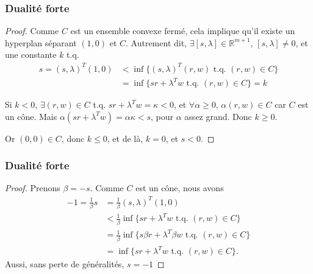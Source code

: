 \documentclass[usepdftitle=false]{beamer}
\def\RR{\mathbb{R}}
\begin{document}
\begin{frame}
\frametitle{Dualité forte}

\begin{proof}

Comme $C$ est un ensemble convexe fermé, cela implique qu'il existe un hyperplan séparant $(1,0)$ et $C$. Autrement dit, $\exists [s, \lambda] \in \RR^{m+1}$, $[s, \lambda] \ne 0$, et une constante $k$ t.q.
\begin{align*}
s = (s, \lambda)^T (1,0) &< \inf \lbrace (s, \lambda)^T(r,w) \mbox{ t.q. } (r,w) \in C \rbrace \\
& = \inf \lbrace sr + \lambda^Tw \mbox{ t.q. } (r,w) \in C \rbrace = k
\end{align*}

Si $k < 0$, $\exists (r,w) \in C$ t.q. $sr + \lambda^T w = \kappa < 0$, et $\forall \alpha \geq 0$, $\alpha (r,w) \in C$ car $C$ est un cône. Mais $\alpha (s r + \lambda^T  w) = \alpha\kappa < s$, pour $\alpha$ assez grand. Donc $k \geq 0$.

\mbox{}

Or $(0,0) \in C$, donc $k \leq 0$, et de là, $k = 0$, et $s < 0$.
\end{proof}

\end{frame}

\begin{frame}
\frametitle{Dualité forte}

\begin{proof}
Prenons $\beta = -s$. Comme $C$ est un cône, nous avons
\begin{align*}
-1 = \frac{1}{\beta}s &= \frac{1}{\beta}(s,\lambda)^T(1,0) \\
&< \frac{1}{\beta}\inf \lbrace sr + \lambda^Tw \mbox{ t.q. } (r,w) \in C \rbrace \\
&= \frac{1}{\beta}\inf \lbrace s\beta r + \lambda^T \beta w \mbox{ t.q. } (r,w) \in C \rbrace \\
&= \inf \lbrace s r + \lambda^T w \mbox{ t.q. } (r,w) \in C \rbrace.
\end{align*}
Aussi, sans perte de généralités, $s = -1$

\end{proof}

\end{frame}
\end{document}
